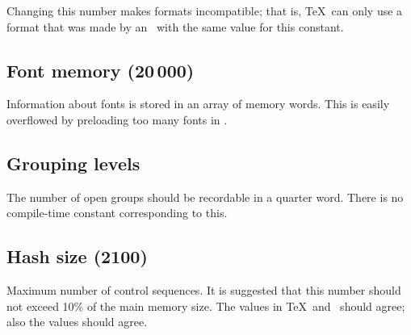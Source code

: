 \documentclass[twoside,letterpaper,openright]{rapport3}
\begin{document}
Changing this  number makes formats incompatible;
that is, \TeX\ can only use a format that was made by
an \IniTeX\ with the same value for this constant.

\subsection{Font memory (20$\,$000)}

Information about fonts is stored in an array of
memory words. This is easily overflowed by preloading too
many fonts in \IniTeX.

\subsection{Grouping levels}

The number of open groups  should be recordable 
in a quarter word. There is no compile-time constant corresponding
to this.

\subsection{Hash size {\rm(2100)}}

Maximum number of control sequences. It is suggested that
this number should not exceed 10\% of the main memory size.
The values in \TeX\ and \IniTeX\ should agree; also the
 values should agree.
\end{document}
